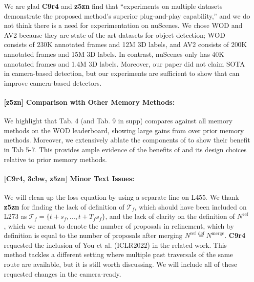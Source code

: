 \documentclass[10pt,twocolumn,letterpaper]{article}
\newcommand{\reviewerOne}{{\textcolor{TealBlue}{\textbf{C9r4}}}}
\newcommand{\reviewerTwo}{{\textcolor{Mulberry}{\textbf{3cbw}}}}
\newcommand{\reviewerThree}{{\textcolor{BurntOrange}{\textbf{z5zn}}}}
\begin{document}
We are glad \reviewerOne{} and \reviewerThree{} find that ``experiments on multiple datasets demonstrate the proposed method’s superior plug-and-play capability,'' and we do not think there is a need for experimentation on nuScenes. We chose WOD and AV2 because they are state-of-the-art datasets for object detection; WOD consists of 230K annotated frames and 12M 3D labels,
and AV2 consists of 200K annotated frames and 15M 3D labels. In contrast, nuScenes only has 40K annotated frames and 1.4M 3D labels.
Moreover, our paper did not claim SOTA in camera-based detection,
but our experiments are sufficient to show that \ourmodel{}
can improve camera-based detectors.


\paragraph{[\reviewerThree{}] Comparison with Other Memory Methods:}
We highlight that Tab. 4 (and Tab. 9 in supp) compares \ourmodel{} against all memory methods
on the WOD leaderboard, showing large gains from \ourmodel{} over prior memory methods. Moreover, we extensively ablate the components of \ourmodel{} to show their benefit in Tab 5-7. This provides ample evidence of the benefits of \ourmodel{} and its design choices relative to prior memory methods.

\paragraph{[\reviewerOne{}, \reviewerTwo{}, \reviewerThree{}] Minor Text Issues:}
We will clean up the loss equation by using a separate line on L455.
We thank \reviewerThree{} for finding the lack of definition of $\mathcal{T}_f$, which
should have been included on L273 as $\mathcal{T}_f = \{t + s_f, \dots, t + T_f s_f\}$,
and the lack of clarity on the definition of $N^{\mathrm{ref}}$, which we meant to denote the number of
proposals in refinement, which by definition is equal to the number of proposals after merging $N^{\mathrm{ref}} \overset{\mathrm{def}}{=} N^\mathrm{merge}$.
\reviewerOne{} requested the inclusion of You et al. (ICLR2022) in the related work. This method tackles a different setting where multiple past traversals of the same route are available, but it is still worth discussing.
We will include all of these requested changes in the camera-ready.
\end{document}
